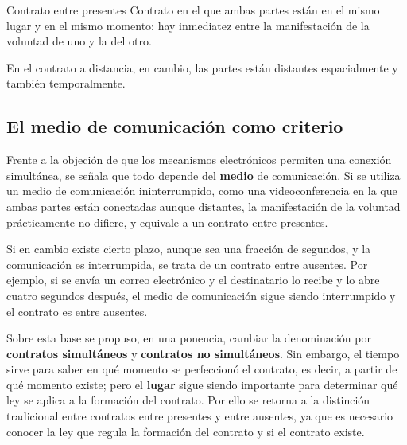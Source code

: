 \documentclass[12pt,oneside]{book}
\begin{document}
\begin{definition}{Contrato entre presentes}
Contrato en el que ambas partes están en el mismo lugar y en el mismo momento: hay inmediatez entre la manifestación de la voluntad de uno y la del otro.
\end{definition}

En el contrato a distancia, en cambio, las partes están distantes espacialmente y también temporalmente.

\subsection{El medio de comunicación como criterio}

Frente a la objeción de que los mecanismos electrónicos permiten una conexión simultánea, se señala que todo depende del \textbf{medio} de comunicación. Si se utiliza un medio de comunicación ininterrumpido, como una videoconferencia en la que ambas partes están conectadas aunque distantes, la manifestación de la voluntad prácticamente no difiere, y equivale a un contrato entre presentes.

Si en cambio existe cierto plazo, aunque sea una fracción de segundos, y la comunicación es interrumpida, se trata de un contrato entre ausentes. Por ejemplo, si se envía un correo electrónico y el destinatario lo recibe y lo abre cuatro segundos después, el medio de comunicación sigue siendo interrumpido y el contrato es entre ausentes.

Sobre esta base se propuso, en una ponencia, cambiar la denominación por \textbf{contratos simultáneos} y \textbf{contratos no simultáneos}. Sin embargo, el tiempo sirve para saber en qué momento se perfeccionó el contrato, es decir, a partir de qué momento existe; pero el \textbf{lugar} sigue siendo importante para determinar qué ley se aplica a la formación del contrato. Por ello se retorna a la distinción tradicional entre contratos entre presentes y entre ausentes, ya que es necesario conocer la ley que regula la formación del contrato y si el contrato existe.
\end{document}
